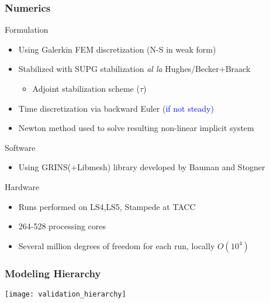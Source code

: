 \documentclass[mathserif]{beamer}
\begin{document}
%
%
%
\begin{frame}
  \frametitle{Numerics}
  \begin{block}{Formulation}
    \begin{itemize}
    \item Using Galerkin FEM discretization (N-S in weak form)
    \item Stabilized with SUPG stabilization \textit{al la} Hughes/Becker+Braack
      \begin{itemize}
      \item Adjoint stabilization scheme ($\tau$)
      \end{itemize}
    \item Time discretization via backward Euler \textcolor{blue}{(if not steady)}
    \item Newton method used to solve resulting non-linear implicit system
    \end{itemize}
  \end{block}

  \begin{block}{Software}
    \begin{itemize}
    \item Using GRINS(+Libmesh) library developed by Bauman and Stogner
    \end{itemize}
  \end{block}

  \begin{block}{Hardware}
    \begin{itemize}
    \item Runs performed on LS4,LS5, Stampede at TACC
    \item 264-528 processing cores
    \item Several million degrees of freedom for each run, locally $O(10^4)$ 
    \end{itemize}
  \end{block}

\end{frame}


%
%
%
\begin{frame}
  \frametitle{Modeling Hierarchy}

    \begin{center}
    \texttt{[image: validation\_hierarchy]}
   \end{center}

\end{frame}
\end{document}
